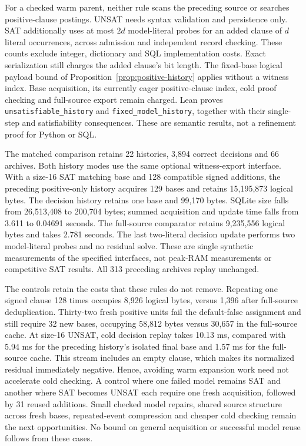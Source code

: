 \documentclass[11pt,a4paper]{article}
\numberwithin{equation}{section}
\theoremstyle{plain}
\theoremstyle{definition}
\theoremstyle{remark}
\begin{document}
For a checked warm parent, neither rule scans the preceding source or searches positive-clause postings. UNSAT needs syntax validation and persistence only. SAT additionally uses at most $2d$ model-literal probes for an added clause of $d$ literal occurrences, across admission and independent record checking. These counts exclude integer, dictionary and SQL implementation costs. Exact serialization still charges the added clause's bit length. The fixed-base logical payload bound of Proposition~\ref{prop:positive-history} applies without a witness index. Base acquisition, its currently eager positive-clause index, cold proof checking and full-source export remain charged. Lean proves \texttt{unsatisfiable\_history} and \texttt{fixed\_model\_history}, together with their single-step and satisfiability consequences. These are semantic results, not a refinement proof for Python or SQL.

The matched comparison retains 22 histories, 3,894 correct decisions and 66 archives. Both history modes use the same optional witness-export interface. With a size-16 SAT matching base and 128 compatible signed additions, the preceding positive-only history acquires 129 bases and retains 15,195,873 logical bytes. The decision history retains one base and 99,170 bytes. SQLite size falls from 26,513,408 to 200,704 bytes; summed acquisition and update time falls from 3.611 to 0.04691 seconds. The full-source comparator retains 9,235,556 logical bytes and takes 2.781 seconds. The last two-literal decision update performs two model-literal probes and no residual solve. These are single synthetic measurements of the specified interfaces, not peak-RAM measurements or competitive SAT results. All 313 preceding archives replay unchanged.

The controls retain the costs that these rules do not remove. Repeating one signed clause 128 times occupies 8,926 logical bytes, versus 1,396 after full-source deduplication. Thirty-two fresh positive units fail the default-false assignment and still require 32 new bases, occupying 58,812 bytes versus 30,657 in the full-source cache. At size-16 UNSAT, cold decision replay takes 10.13 ms, compared with 5.94 ms for the preceding history's isolated final base and 1.57 ms for the full-source cache. This stream includes an empty clause, which makes its normalized residual immediately negative. Hence, avoiding warm expansion work need not accelerate cold checking. A control where one failed model remains SAT and another where SAT becomes UNSAT each require one fresh acquisition, followed by 31 reused additions. Small checked model repairs, shared source structure across fresh bases, repeated-event compression and cheaper cold checking remain the next opportunities. No bound on general acquisition or successful model reuse follows from these cases.
\end{document}
